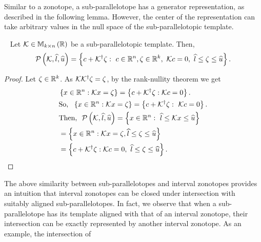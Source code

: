 Similar to a zonotope, a sub-parallelotope has a generator
representation, as described in the following lemma.  However,
the center of the representation can take arbitrary values in the null
space of the sub-parallelotopic template.
%
\begin{lemma}~\label{lem:ptope-iz-conversion}
  Let $\mathcal{K}\in\mathbb{M}_{k\times n}\left(\mathbb{R}\right)$ be a sub-parallelotopic template.
  Then,
  \[
  \mathcal{P}\left(\mathcal{K},\widehat{l},\widehat{u}\right)=\left\{c+{\mathcal{K}}^\dagger\zeta:~c\in\mathbb{R}^n,\zeta\in\mathbb{R}^k,~\mathcal{K}
  c=0,~\widehat{l}\leq
  \zeta\leq \widehat{u}
  \right\}.
  \]
%
\end{lemma}
%
\begin{proof}
Let $\zeta\in\mathbb{R}^k$.  As $\mathcal{K}{{\mathcal{K}}^\dagger\zeta}=\zeta$,
by the rank-nullity theorem we get
%
\begin{align*}
& \left\{x\in\mathbb{R}^n:\mathcal{K} x=\zeta\right\}=\left\{c+{\mathcal{K}}^\dagger\zeta:\mathcal{K} c=0\right\}.\\
& \text{So,}~~\left\{x\in\mathbb{R}^n:\mathcal{K} x=\zeta\right\}=\left\{c+{\mathcal{K}}^\dagger\zeta:~\mathcal{K} c=0\right\}.\\
& \text{Then,} ~~\mathcal{P}\left(\mathcal{K},\widehat{l},\widehat{u}\right) = \left\{x\in\mathbb{R}^n:~\widehat{l}\leq \mathcal{K} x\leq\widehat{u}\right\}\nonumber\\
& = \left\{x\in\mathbb{R}^n:\mathcal{K}
  x=\zeta, \widehat{l}\leq \zeta\leq\widehat{u}\right\}\nonumber\\
& = \left\{c+{\mathcal{K}}^\dagger\zeta:\mathcal{K} c=0,~\widehat{l}\leq\zeta\leq\widehat{u}\right\}.\hspace{5em}\qedhere
\end{align*}
%
\end{proof}
%
The above similarity between sub-parallelotopes and interval
zonotopes provides an intuition that interval zonotopes can be
closed under intersection with suitably aligned
sub-parallelotopes.  In fact, we observe that when a
sub-parallelotope has its template aligned with that of an interval
zonotope, their intersection can be exactly represented by another
interval zonotope.  As an example, the intersection of
%
